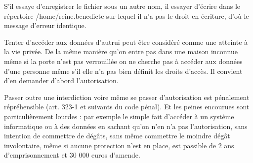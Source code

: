 S'il essaye d'enregistrer le fichier sous un autre nom, il essayer d'écrire dans le répertoire /home/reine.benedicte sur lequel il n'a pas le droit en écriture, d'où le message d'erreur identique.\par
Tenter d'accéder aux données d'autrui peut être considéré comme une atteinte à la vie privée. De la même manière qu'on entre pas dans une maison inconnue même si la porte n'est pas verrouillée on ne cherche pas à accéder aux données d'une personne même s'il elle n'a pas bien définit les droits d'accès. Il convient d'en demander d'abord l'autorisation.\par
Passer outre une interdiction voire même se passer d'autorisation est pénalement répréhensible (art. 323-1 et suivants du code pénal). Et les peines encourues sont particulièrement lourdes : par exemple le simple fait d'accéder à un système informatique ou à des données en sachant qu'on n'en n'a pas l'autorisation, sans intention de commettre de dégâts, sans même commettre le moindre dégât involontaire, même si aucune protection n'est en place, est passible de 2 ans d'emprisonnement et 30 000 euros d'amende. 











